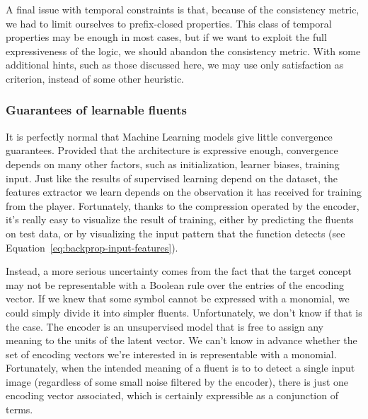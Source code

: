 A final issue with temporal constraints is that, because of the consistency
metric, we had to limit ourselves to prefix-closed properties. This class of
temporal properties may be enough in most cases, but if we want to exploit the
full expressiveness of the logic, we should abandon the consistency metric.
With some additional hints, such as those discussed here, we may use only
satisfaction as criterion, instead of some other heuristic.


\subsubsection*{Guarantees of learnable fluents}

It is perfectly normal that Machine Learning models give little convergence
guarantees. Provided that the architecture is expressive enough, convergence
depends on many other factors, such as initialization, learner biases,
training input. Just like the results of supervised learning depend on the
dataset, the features extractor we learn depends on the observation it has
received for training from the player. Fortunately, thanks to the compression
operated by the encoder, it's really easy to visualize the result of training,
either by predicting the fluents on test data, or by visualizing the input
pattern that the function detects (see
Equation~\ref{eq:backprop-input-features}).

Instead, a more serious uncertainty comes from the fact that the target
concept may not be representable with a Boolean rule over the entries of the
encoding vector.  If we knew that some symbol cannot be expressed with a
monomial, we could simply divide it into simpler fluents. Unfortunately, we
don't know if that is the case. The encoder is an unsupervised model that is
free to assign any meaning to the units of the latent vector. We can't know in
advance whether the set of encoding vectors we're interested in is
representable with a monomial. Fortunately, when the intended meaning of a
fluent is to to detect a single input image (regardless of some small noise
filtered by the encoder), there is just one encoding vector associated,
which is certainly expressible as a conjunction of terms.

